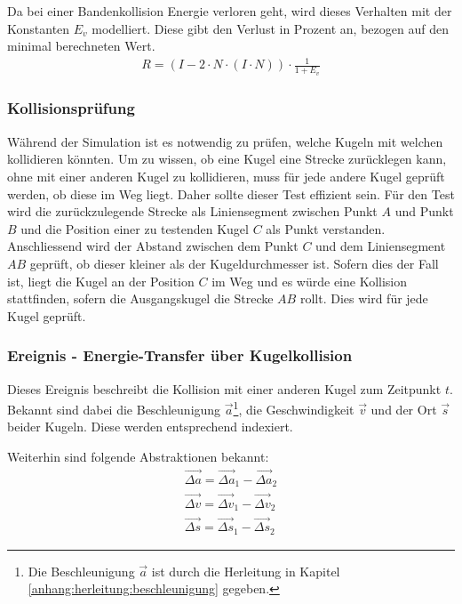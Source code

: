 Da bei einer Bandenkollision Energie verloren geht, wird dieses Verhalten mit der Konstanten $E_v$ modelliert.
Diese gibt den Verlust in Prozent an, bezogen auf den minimal berechneten Wert.
\begin{align}
    R = (I - 2 \cdot N \cdot (I \cdot N)) \cdot \frac{1}{1 + E_v}
\end{align}
\subsubsection{Kollisionsprüfung}
Während der Simulation ist es notwendig zu prüfen, welche Kugeln mit welchen kollidieren könnten.
Um zu wissen, ob eine Kugel eine Strecke zurücklegen kann, ohne mit einer anderen Kugel zu kollidieren,
muss für jede andere Kugel geprüft werden, ob diese im Weg liegt. Daher sollte dieser Test effizient sein.
Für den Test wird die zurückzulegende Strecke als Liniensegment zwischen Punkt $A$ und Punkt $B$ und die Position
einer zu testenden Kugel $C$ als Punkt verstanden. Anschliessend wird der Abstand zwischen dem Punkt $C$ und dem
Liniensegment $AB$ geprüft, ob dieser kleiner als der Kugeldurchmesser ist. Sofern dies der Fall ist, liegt die Kugel an
der Position $C$ im Weg und es würde eine Kollision stattfinden, sofern die Ausgangskugel die Strecke $AB$ rollt.
Dies wird für jede Kugel geprüft.


\subsubsection{Ereignis - Energie-Transfer über Kugelkollision}
Dieses Ereignis beschreibt die Kollision mit einer anderen Kugel zum Zeitpunkt $t$.
Bekannt sind dabei die Beschleunigung $\vec{a}$\footnote{Die Beschleunigung $\vec{a}$ ist durch die Herleitung in Kapitel \ref{anhang:herleitung:beschleunigung}
gegeben.}, die Geschwindigkeit $\vec{v}$ und der Ort $\vec{s}$ beider Kugeln.
Diese werden entsprechend indexiert.

Weiterhin sind folgende Abstraktionen bekannt:
\begin{align}
    \vec{\Delta a} = \vec{\Delta a}_1 - \vec{\Delta a}_2\\
    \vec{\Delta v} = \vec{\Delta v}_1 - \vec{\Delta v}_2\\
    \vec{\Delta s} = \vec{\Delta s}_1 - \vec{\Delta s}_2
\end{align}

